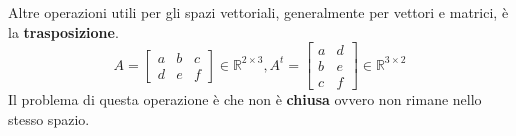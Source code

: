 Altre operazioni utili per gli spazi vettoriali, generalmente per vettori e matrici, è
la \textbf{trasposizione}.
\begin{equation}
    A=\left[\begin{array}{ccc}
            a & b & c \\
            d & e & f
        \end{array}\right]\in \mathbb{R}^{2\times3},  A^t = \left[\begin{array}{cc}
            a & d \\
            b & e \\
            c & f
        \end{array}\right]\in \mathbb{R}^{3\times2}
\end{equation}
Il problema di questa operazione è che non è \textbf{chiusa} ovvero non rimane
nello stesso spazio.

